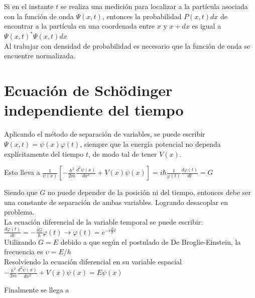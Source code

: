 \documentclass[oneside]{book}
\numberwithin{equation}{section}
\numberwithin{figure}{section}
\numberwithin{table}{section}
\begin{document}
				Si en el instante $t$ se realiza una medición para localizar a la partícula asociada con la función de onda $\displaystyle \Psi(x,t)$, entonces la probabilidad $P(x,t)dx$ de encontrar a la partícula en una coordenada entre $x$ y $x+dx$ es igual a $\displaystyle \Psi(x,t)^*\Psi(x,t)dx$\\
		
				Al trabajar con densidad de probabilidad es necesario que la función de onda se encuentre normalizada.\\		
			
		\section{Ecuación de Schödinger independiente del tiempo}
			
			Aplicando el método de separación de variables, se puede escribir $\Psi(x,t)=\psi(x)\varphi(t)$, siempre que la energía potencial no dependa explícitamente del tiempo $t$, de modo tal de tener $V(x)$.\\
			
			\begin{center}
			Esto lleva a $\displaystyle \frac{1}{\psi(x)}\left[-\frac{\hbar^2}{2m}\frac{d^2\psi(x)}{dx^2}+V(x)\psi(x)\right]=i\hbar\frac{1}{\varphi(t)}\frac{d\varphi(t)}{dt}=G$
			\end{center}
		
			Siendo que $G$ no puede depender de la posición ni del tiempo, entonces debe ser una constante de separación de ambas variables. Logrando desacoplar en problema.\\
		
			La ecuación diferencial de la variable temporal se puede escribir: $\displaystyle \frac{d\varphi(t)}{dt}=-\frac{iG}{\hbar}\varphi(t) \rightarrow \varphi(t)=e^{-i\frac{E}{\hbar}t}$\\
		
			Utilizando $G=E$ debido a que según el postulado de De Broglie-Einstein, la frecuencia es $\upsilon=E/h$\\
			
			Resolviendo la ecuación diferencial en su variable espacial $\displaystyle -\frac{\hbar^2}{2m}\frac{d^2\psi(x)}{dx^2}+V(x)\psi(x)=E\psi(x)$\\
			
			\begin{center}
			Finalmente se llega a 
			\end{center}
		
\end{document}
